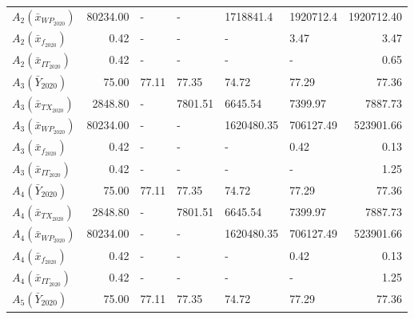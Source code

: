 \begin{tabular}{lrllllr}
 $A_{2}(\bar{x}_{WP_{2020}})$ & 80234.00 &                   - &                   - &           1718841.4 &           1920712.4 &           1920712.40 \\
  $A_{2}(\bar{x}_{f_{2020}})$ &     0.42 &                   - &                   - &                   - &                3.47 &                 3.47 \\
 $A_{2}(\bar{x}_{IT_{2020}})$ &     0.42 &                   - &                   - &                   - &                   - &                 0.65 \\
      $A_{3}(\bar{Y}_{2020})$ &    75.00 &               77.11 &               77.35 &               74.72 &               77.29 &                77.36 \\
 $A_{3}(\bar{x}_{TX_{2020}})$ &  2848.80 &                   - &             7801.51 &             6645.54 &             7399.97 &              7887.73 \\
 $A_{3}(\bar{x}_{WP_{2020}})$ & 80234.00 &                   - &                   - &          1620480.35 &           706127.49 &            523901.66 \\
  $A_{3}(\bar{x}_{f_{2020}})$ &     0.42 &                   - &                   - &                   - &                0.42 &                 0.13 \\
 $A_{3}(\bar{x}_{IT_{2020}})$ &     0.42 &                   - &                   - &                   - &                   - &                 1.25 \\
      $A_{4}(\bar{Y}_{2020})$ &    75.00 &               77.11 &               77.35 &               74.72 &               77.29 &                77.36 \\
 $A_{4}(\bar{x}_{TX_{2020}})$ &  2848.80 &                   - &             7801.51 &             6645.54 &             7399.97 &              7887.73 \\
 $A_{4}(\bar{x}_{WP_{2020}})$ & 80234.00 &                   - &                   - &          1620480.35 &           706127.49 &            523901.66 \\
  $A_{4}(\bar{x}_{f_{2020}})$ &     0.42 &                   - &                   - &                   - &                0.42 &                 0.13 \\
 $A_{4}(\bar{x}_{IT_{2020}})$ &     0.42 &                   - &                   - &                   - &                   - &                 1.25 \\
      $A_{5}(\bar{Y}_{2020})$ &    75.00 &               77.11 &               77.35 &               74.72 &               77.29 &                77.36 \\

\end{tabular}
